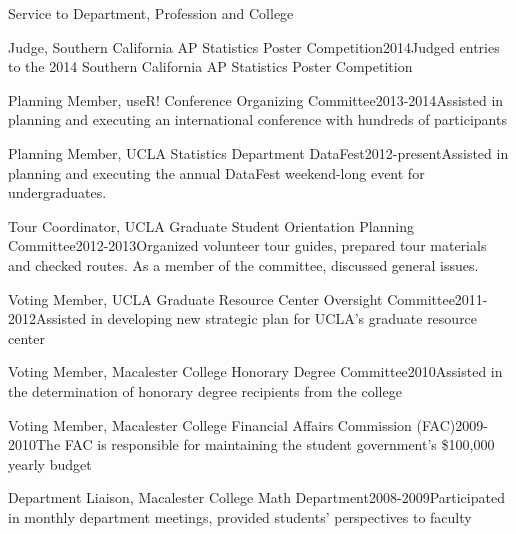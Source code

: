 \documentclass{resume} %
\begin{document}
\begin{rSection}{Service to Department, Profession and College}

\begin{sSubsection}{Judge, Southern California AP Statistics Poster Competition}{}{2014}{Judged entries to the 2014 Southern California AP Statistics Poster Competition}{}
\end{sSubsection}

\begin{sSubsection}{Planning Member, useR! Conference Organizing Committee}{}{2013-2014}{Assisted in planning and executing an international conference with hundreds of participants}{}
\end{sSubsection}

\begin{sSubsection}{Planning Member, UCLA Statistics Department DataFest}{}{2012-present}{Assisted in planning and executing the annual DataFest weekend-long event for undergraduates.}{}
\end{sSubsection}

\begin{sSubsection}{Tour Coordinator, UCLA Graduate Student Orientation Planning Committee}{}{2012-2013}{Organized volunteer tour guides, prepared tour materials and checked routes. As a member of the committee, discussed general issues.}{}
\end{sSubsection}

\begin{sSubsection}{Voting Member, UCLA Graduate Resource Center Oversight Committee}{}{2011-2012}{Assisted in developing new strategic plan for UCLA's graduate resource center}{}
\end{sSubsection}

\begin{sSubsection}{Voting Member, Macalester College Honorary Degree Committee}{}{2010}{Assisted in the determination of honorary degree recipients from the college}{}
\end{sSubsection}

\begin{sSubsection}{Voting Member, Macalester College Financial Affairs Commission (FAC)}{}{2009-2010}{The FAC is responsible for maintaining the student government's \$100,000 yearly budget}{}
\end{sSubsection}

\begin{sSubsection}{Department Liaison, }{Macalester College Math Department}{2008-2009}{Participated in monthly department meetings, provided students' perspectives to faculty}{}
\end{sSubsection}
\end{rSection}
\end{document}
